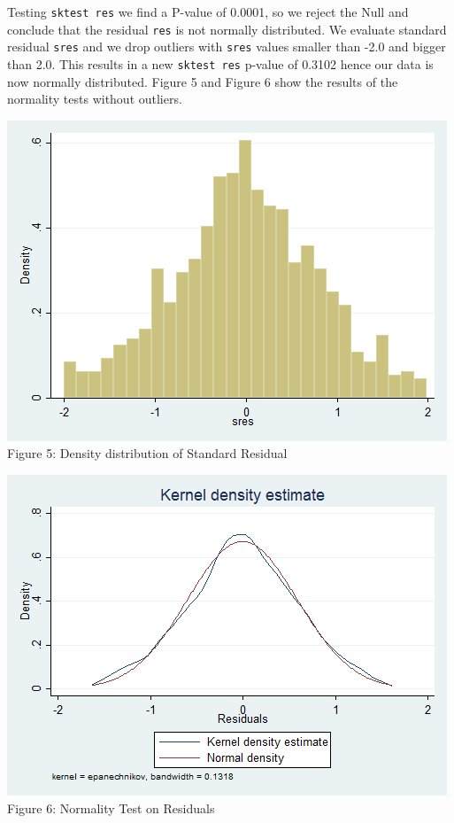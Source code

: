 \documentclass[10pt]{article}
\begin{document}
Testing {\tt sktest res} we find a P-value of 0.0001, so we reject the Null and conclude that the residual {\tt res} is not normally distributed. We evaluate standard residual {\tt sres} and we drop outliers with {\tt sres} values smaller than -2.0 and bigger than 2.0. This results in a new {\tt sktest res} p-value of 0.3102 hence our data is now normally distributed. Figure 5 and Figure 6 show the results of the normality tests without outliers. 

\begin{center}
\includegraphics[scale=0.4]{g16.png}\\
Figure 5: Density distribution of Standard Residual
\end{center}

\begin{center}
\includegraphics[scale=0.4]{g15.png}\\
Figure 6: Normality Test on Residuals
\end{center}
\end{document}
